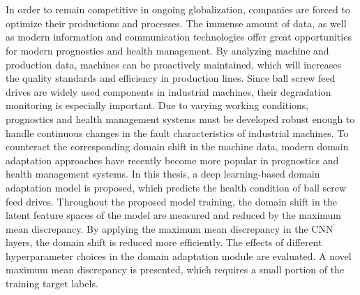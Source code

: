 \chapter{\abstractname}

In order to remain competitive in ongoing globalization, companies are forced to optimize their productions and processes. The immense amount of data, as well as modern information and communication technologies offer great opportunities for modern prognostics and health management. By analyzing machine and production data, machines can be proactively maintained, which will increases the quality standards and efficiency in production lines. Since ball screw feed drives are widely used components in industrial machines, their degradation monitoring is especially important. Due to varying working conditions, prognostics and health management systems must be developed robust enough to handle continuous changes in the fault characteristics of industrial machines. To counteract the corresponding domain shift in the machine data, modern domain adaptation approaches have recently become more popular in prognostics and health management systems. In this thesis, a deep learning-based domain adaptation model is proposed, which predicts the health condition of ball screw feed drives. Throughout the proposed model training, the domain shift in the latent feature spaces of the model are measured and reduced by the maximum mean discrepancy. By applying the maximum mean discrepancy in the CNN layers, the domain shift is reduced more efficiently. The effects of different hyperparameter choices in the domain adaptation module are evaluated. A novel maximum mean discrepancy is presented, which requires a small portion of the training target labels. 


\makeatletter
{}
{\renewcommand{\abstractname}{Kurzfassung}}
{\renewcommand{\abstractname}{Abstract}}
\makeatother

\chapter{\abstractname}

